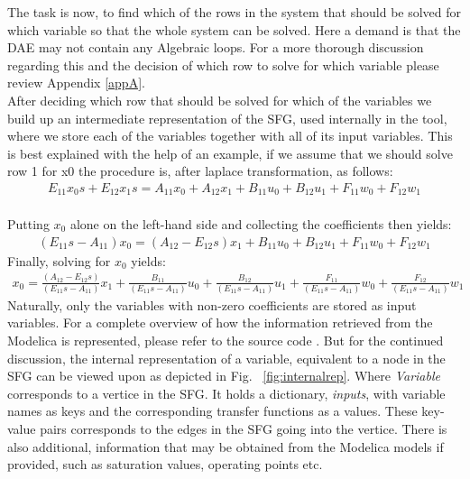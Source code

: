 %
The task is now, to find which of the rows in the system that should be solved for which variable so that the whole system can be solved. Here a demand is that the DAE may not contain any Algebraic loops. For a more thorough discussion regarding this and the decision of which row to solve for which variable please review Appendix \ref{appA}.\\\newline After deciding which row that should be solved for which of the variables we build up an intermediate representation of the SFG, used internally in the tool, where we store each of the variables together with all of its input variables. This is best explained with the help of an example, if we assume that we should solve row 1 for x0 the procedure is, after laplace transformation, as follows:
%
\begin{equation}
\begin{array}{rcl} E_{11}x_0s  +E_{12}x_1s=A_{11}x_0  +A_{12}x_1 +B_{11}u_0  +B_{12}u_1  +F_{11}w_0  +F_{12}w_1 
\end{array}
\end{equation}\\
%
Putting $x_0$ alone on the left-hand side and collecting the coefficients then yields:%
\begin{equation}
\begin{array}{rcl} (E_{11}s-A_{11})x_0  =(A_{12}-E_{12}s)x_1 +B_{11}u_0  +B_{12}u_1 +F_{11}w_0  +F_{12}w_1 
\end{array}
\end{equation}
%
Finally, solving for $x_0$ yields:
\begin{equation}
\begin{array}{rcl} x_0  = \frac{(A_{12}-E_{12}s)}{(E_{11}s-A_{11})}x_1 +\frac{B_{11}}{(E_{11}s-A_{11})}u_0  +\frac{B_{12}}{(E_{11}s-A_{11})}u_1 +\frac{F_{11}}{(E_{11}s-A_{11})}w_0 +\frac{F_{12}}{(E_{11}s-A_{11})}w_1
\end{array}
\end{equation}
%
Naturally, only the variables with non-zero coefficients are stored as input variables. For a complete overview of how the information retrieved from the Modelica is represented, please refer to the source code \cite{githabb}\nocite{*}. But for the continued discussion, the internal representation of a variable, equivalent to a node in the SFG can be viewed upon as depicted in Fig. ~\ref{fig:internalrep}. Where \textit{Variable} corresponds to a vertice in the SFG. It holds a dictionary, \textit{inputs}, with variable names as keys and the corresponding transfer functions as a values. These key-value pairs corresponds to the edges in the SFG going into the vertice. There is also additional, information that may be obtained from the Modelica models if provided, such as saturation values, operating points etc.%
